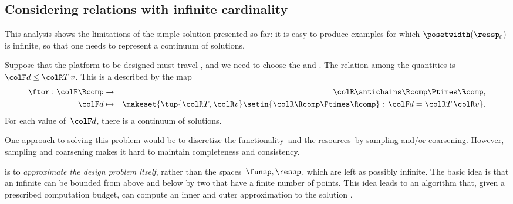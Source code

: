 \subsection{Considering relations with infinite cardinality}

This analysis shows the limitations of the simple solution presented so far: it is easy to produce examples for which $\posetwidth(\ressp_{0})$ is infinite, so that one needs to represent a continuum of solutions.

\begin{example}
    Suppose that the platform to be designed must travel , and we need to choose the  and .
    The relation among the quantities is~${\colF d}\leq{\colR T\,v}$.
    This is a  described by the map
    \begin{eqnarray*}
        \ftor:{\colF\Rcomp} & \to & {\colR\antichains\Rcomp\Ptimes\Rcomp,}\\
        {\colF d} & \mapsto & \makeset{\tup{{\colR T},{\colR v}}\setin{\colR\Rcomp\Ptimes\Rcomp}:\,{\colF d}={\colR T}\,{\colR v}}.
    \end{eqnarray*}
    For each value of~${\colF d}$, there is a continuum of solutions.
\end{example}
One approach to solving this problem would be to discretize the functionality~\funsp and the resources~\ressp by sampling and/or coarsening.
However, sampling and coarsening makes it hard to maintain completeness and consistency.

%
%
is to \emph{approximate the design problem} \emph{itself}, rather than the spaces~$\funsp,\ressp$, which are left as possibly infinite.
The basic idea is that an infinite  can be bounded from above and below by two  that have a finite number of points.
This idea leads to an algorithm that, given a prescribed computation budget, can compute an inner and outer approximation to the solution .
